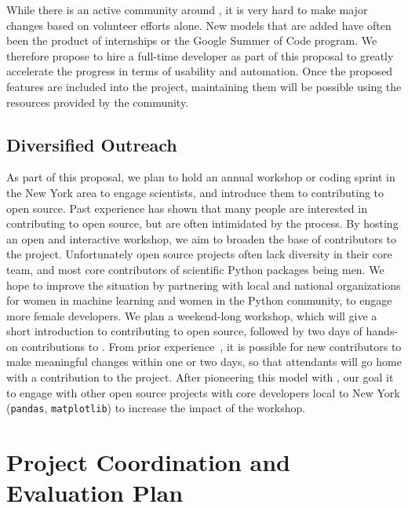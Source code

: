 While there is an active community around \sklearn{}, it is very hard to make
major changes based on volunteer efforts alone. New models that are added have
often been the product of internships or the Google Summer of Code program.  We
therefore propose to hire a full-time developer as part of this proposal to
greatly accelerate the progress in terms of usability and automation. Once
the proposed features are included into the project, maintaining them will be
possible using the resources provided by the community. 

\subsection{Diversified Outreach}
As part of this proposal, we plan to hold an annual workshop or coding sprint
in the New York area to engage scientists, and introduce them to contributing
to open source. Past experience has shown that many people are interested
in contributing to open source, but are often intimidated by the process.
By hosting an open and interactive workshop, we aim to broaden the base
of contributors to the \sklearn{} project.
Unfortunately open source projects often lack diversity in their core team,
and most core contributors of scientific Python packages being men.
We hope to improve the situation by partnering with local and national
organizations for women in machine learning and women in the Python community,
to engage more female developers.
We plan a weekend-long workshop, which will give a short introduction to
contributing to open source, followed by two days of hands-on contributions to
\sklearn{}.
From prior experience~\autocite{meetupsprintSF}, it is possible for new
contributors to make meaningful changes within one or two days, so that
attendants will go home with a contribution to the project. After pioneering
this model with \sklearn{}, our goal it to engage with other open source
projects with core developers local to New York (\texttt{pandas},
\texttt{matplotlib}) to increase the impact of the workshop.

\section{Project Coordination and Evaluation Plan}
